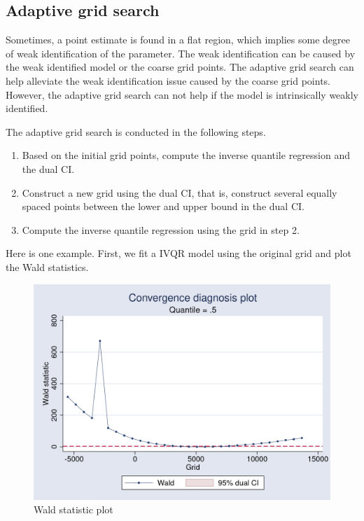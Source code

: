 \subsection{Adaptive grid search}
Sometimes, a point estimate is found in a flat region, which implies some
degree of weak identification of the parameter. The weak identification can be
caused by the weak identified model or the coarse grid points. The
adaptive grid search can help alleviate the weak identification issue caused by
the coarse grid points. However, the adaptive grid search can not help if the
model is intrinsically weakly identified.

The adaptive grid search is conducted in the following steps.

\begin{enumerate}
  \item Based on the initial grid points, compute the inverse quantile
    regression and the dual CI. 
  \item Construct a new grid using the dual CI, that is, construct several
    equally spaced points between the lower and upper bound in the dual CI.
  \item Compute the inverse quantile regression using the grid in 
    step 2.
\end{enumerate}

Here is one example. First, we fit a IVQR model using the original grid and
plot the Wald statistics.

\begin{stlog}

\end{stlog}

\begin{figure}[H]
\caption{Wald statistic plot}
\label{fig:dualci}
\centering
\includegraphics[scale=0.3]{eps/waldplot_asset}
\end{figure}

